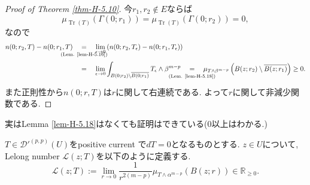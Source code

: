 \begin{proof}[Proof of Theorem \ref{thm-H-5.10}]
今$r_1,r_2\notin E$ならば
\begin{equation*}
\mu_{\operatorname{Tr}(T)}(\Gamma(0;r_1))
=
\mu_{\operatorname{Tr}(T)}(\Gamma(0;r_2))
=
0,
\end{equation*}
なので
\begin{align*}
n(0;r_2,T)-n(0;r_1,T)
&\underalign{\text{(Lem. \ref{lem-H-5.16})}}{=}
\lim_{\epsilon\to0}
\left(
n(0;r_2,T_\epsilon)-n(0;r_1,T_\epsilon)
\right)\\
&\underalign{\text{}}{=}
\lim_{\epsilon\to0}
\int_{B(0;r_2)\setminus\overline{B(0;r_1)}}
T_\epsilon\wedge\beta^{m-p}
\underalign{\text{(Lem. \ref{lem-H-5.18})}}{=}
\mu_{T\wedge\beta^{m-p}}
\left(
B(z;r_2)\setminus\overline{B(z;r_1)}
\right)
\geq0.
\end{align*}
また正則性から$n(0;r,T)$は$r$に関して右連続である. よって$r$に関して非減少関数である. 
\end{proof}
実はLemma \ref{lem-H-5.18}はなくても証明はできている(0以上はわかる.)

\begin{tcolorbox}[mybox]
\begin{defn}
\label{defn-H-5.19}
$T\in\mathcal{D}'^{(p,p)}(U)$をpositive current で$dT=0$となるものとする. 
$z\in U$について, Lelong number $\mathcal{L}(z;T)$を以下のように定義する. 
\begin{equation*}
\mathcal{L}(z;T)
:=
\lim_{r\to0}
\frac{1}{r^{2(m-p)}}
\mu_{T\wedge\alpha^{m-p}}(B(z;r))
\in\mathbb{R}_{\geq0}.
\end{equation*}
\end{defn}
\end{tcolorbox}





